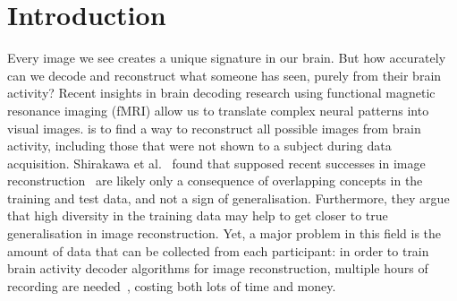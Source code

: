 \chapter{Introduction}\label{introduction}

\noindent{}

\noindent{}

\noindent{}



\noindent{}Every image we see creates a unique signature in our brain. But how accurately can we decode and reconstruct what someone has seen, purely from their brain activity? Recent insights in brain decoding research using functional magnetic resonance imaging (fMRI) allow us to translate complex neural patterns into visual images\cite{shenDeepImageReconstruction2019,scottiMindEye2SharedSubjectModels2024,ozcelikNaturalSceneReconstruction2023}.   is to find a way to reconstruct all possible images from brain activity, including those that were not shown to a subject during data acquisition. Shirakawa et al.~\cite{shirakawaSpuriousReconstructionBrain2024} found that supposed recent successes in image reconstruction~\cite{ozcelikNaturalSceneReconstruction2023,scottiMindEye2SharedSubjectModels2024} are likely only a consequence of overlapping concepts in the training and test data, and not a sign of generalisation. Furthermore, they argue that high diversity in the training data may help to get closer to true generalisation in image reconstruction. Yet, a major problem in this field is the amount of data that can be collected from each participant: in order to train brain activity decoder algorithms for image reconstruction, multiple hours of recording are needed~\cite{horikawaGenericDecodingSeen2017,gifford7TFMRIDataset2025,hebartTHINGSdataMultimodalCollection2023}, costing both lots of time and money. 

